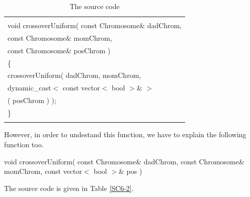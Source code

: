 \documentclass[twocolumn]{article}
\begin{document}
\begin{table}[h]
\begin{center}
\caption{The source code}
\label{SC6}
{\scriptsize
\begin{tabular}{|l|}\hline
\hspace*{7cm}\\
void crossoverUniform( const Chromosome\& dadChrom,\\
\hspace*{4mm} const Chromosome\& momChrom,\\
\hspace*{4mm} const Chromosome\& posChrom )\\
\{\\
\hspace*{4mm} crossoverUniform( dadChrom, momChrom,\\
\hspace*{8mm} dynamic\_cast$<$ const vector$<$ bool $>$\& $>$ \\
\hspace*{12mm} ( posChrom ) );\\
\}\\
\hspace*{7cm}\\\hline
\end{tabular}
}
\end{center}
\end{table}

\noindent
However, in order to undestand this function, we have to explain the
following function too.

\begin{center}
void crossoverUniform( const Chromosome\& dadChrom, const Chromosome\&
momChrom, const vector$<$ bool $>$\& pos )
\end{center}

\noindent
The source code is given in Table \ref{SC6-2}.
\end{document}
